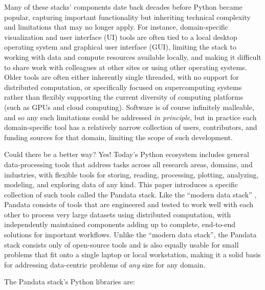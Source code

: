 Many of these stacks' components date back decades before Python became popular, capturing important functionality but inheriting technical complexity and limitations that may no longer apply. For instance, domain-specific visualization and user interface (UI) tools are often tied to a local desktop operating system and graphical user interface (GUI), limiting the stack to working with data and compute resources available locally, and making it difficult to share work with colleagues at other sites or using other operating systems. Older tools are often either inherently single threaded, with no support for distributed computation, or specifically focused on supercomputing systems rather than flexibly supporting the current diversity of computing platforms (such as GPUs and cloud computing). Software is of course infinitely malleable, and so any such limitations could be addressed \emph{in principle}, but in practice each domain-specific tool has a relatively narrow collection of users, contributors, and funding sources for that domain, limiting the scope of such development.

Could there be a better way? Yes! Today's Python ecosystem includes general data-processing tools that address tasks across all research areas, domains, and industries, with flexible tools for storing, reading, processing, plotting, analyzing, modeling, and exploring data of any kind. This paper introduces a specific collection of such tools called the Pandata stack. Like the ``modern data stack'' \citep{handy:dbtb20,jaipuria:substack22}, Pandata consists of tools that are engineered and tested to work well with each other to process very large datasets using distributed computation, with independently maintained components adding up to complete, end-to-end solutions for important workflows. Unlike the ``modern data stack'', the Pandata stack consists only of open-source tools and is also equally usable for small problems that fit onto a single laptop or local workstation, making it a solid basis for addressing data-centric problems of \emph{any} size for any domain.

The Pandata stack's Python libraries are:

